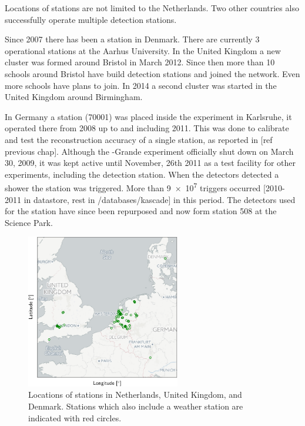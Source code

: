 Locations of \hisparc stations are not limited to the Netherlands. Two other countries also successfully operate multiple detection stations.

Since 2007 there has been a \hisparc station in Denmark. There are currently 3 operational stations at the Aarhus University. In the United Kingdom a new cluster was formed around Bristol in March 2012. Since then more than 10 schools around Bristol have build detection stations and joined the network. Even more schools have plans to join. In 2014 a second cluster was started in the United Kingdom around Birmingham.

In Germany a station (70001) was placed inside the \kascade experiment in Karlsruhe, it operated there from 2008 up to and including 2011. This was done to calibrate and test the reconstruction accuracy of a single \hisparc station, as reported in [ref previous chap]. Although the \kascade-Grande experiment officially shut down on March 30, 2009, it was kept active until November, 26th 2011 as a test facility for other experiments, including the \hisparc detection station. When the \kascade detectors detected a shower the \hisparc station was triggered. More than \num{9e7} triggers occurred [2010-2011 in datastore, rest in /databases/kascade] in this period. The detectors used for the \kascade station have since been repurposed and now form station 508 at the Science Park.

\begin{figure}
    \centering
    \includegraphics[width=0.6\textwidth]
                    {plots/cluster/network}
    \caption{Locations of \hisparc stations in Netherlands, United Kingdom, and Denmark. Stations which also include a weather station are indicated with red circles.}
    \label{fig:network}
\end{figure}


